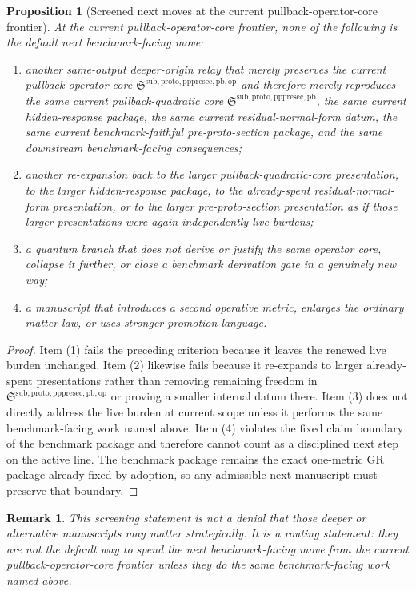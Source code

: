 \documentclass[11pt]{article}
\newcommand{\PrePreProtoSectionPullbackCore}{\mathfrak S^{\mathrm{sub,proto,pppresec,pb}}}
\newcommand{\PullbackOperatorCore}{\mathfrak S^{\mathrm{sub,proto,pppresec,pb,op}}}
\newtheorem{proposition}{Proposition}
\newtheorem{remark}{Remark}
\begin{document}
\begin{proposition}[Screened next moves at the current pullback-operator-core frontier]
At the current pullback-operator-core frontier, none of the following is the default next benchmark-facing move:
\begin{enumerate}
    \item another same-output deeper-origin relay that merely preserves the current pullback-operator core \(\PullbackOperatorCore\) and therefore merely reproduces the same current pullback-quadratic core \(\PrePreProtoSectionPullbackCore\), the same current hidden-response package, the same current residual-normal-form datum, the same current benchmark-faithful pre-proto-section package, and the same downstream benchmark-facing consequences;
    \item another re-expansion back to the larger pullback-quadratic-core presentation, to the larger hidden-response package, to the already-spent residual-normal-form presentation, or to the larger pre-proto-section presentation as if those larger presentations were again independently live burdens;
    \item a quantum branch that does not derive or justify the same operator core, collapse it further, or close a benchmark derivation gate in a genuinely new way;
    \item a manuscript that introduces a second operative metric, enlarges the ordinary matter law, or uses stronger promotion language.
\end{enumerate}
\end{proposition}

\begin{proof}
Item (1) fails the preceding criterion because it leaves the renewed live burden unchanged. Item (2) likewise fails because it re-expands to larger already-spent presentations rather than removing remaining freedom in \(\PullbackOperatorCore\) or proving a smaller internal datum there. Item (3) does not directly address the live burden at current scope unless it performs the same benchmark-facing work named above. Item (4) violates the fixed claim boundary of the benchmark package and therefore cannot count as a disciplined next step on the active line. The benchmark package remains the exact one-metric GR package already fixed by adoption, so any admissible next manuscript must preserve that boundary.
\end{proof}

\begin{remark}
This screening statement is not a denial that those deeper or alternative manuscripts may matter strategically. It is a routing statement: they are not the default way to spend the next benchmark-facing move from the current pullback-operator-core frontier unless they do the same benchmark-facing work named above.
\end{remark}
\end{document}
